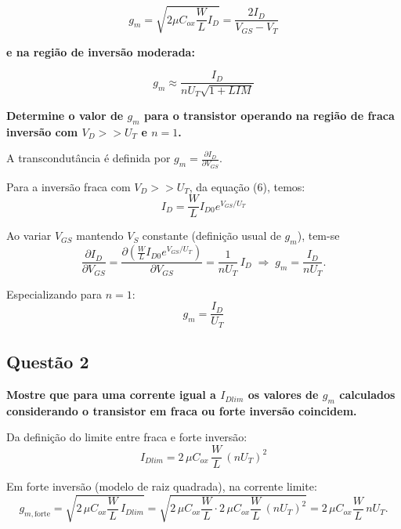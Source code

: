 ﻿\documentclass[12pt,a4paper]{article}
\begin{document}
\begin{equation}
g_m = \sqrt{2\mu C_{ox} \frac{W}{L} I_D} = \frac{2I_D}{V_{GS} - V_T}
\end{equation}

\textbf{e na região de inversão moderada:}

\begin{equation}
g_m \approx \frac{I_D}{nU_T \sqrt{1 +LIM}} 
\end{equation}

\textbf{Determine o valor de $g_m$ para o transistor operando na região de fraca inversão com $V_D >> U_T$ e $n = 1$.}

A transcondutância é definida por $g_m = \frac{\partial I_D}{\partial V_{GS}}$.

Para a inversão fraca com $V_D >> U_T$, da equação (6), temos:
\begin{equation*}
I_D = \frac{W}{L} I_{D0} e^{V_{GS}/U_T}
\end{equation*}

Ao variar $V_{GS}$ mantendo $V_S$ constante (definição usual de $g_m$), tem-se
\begin{equation*}
\frac{\partial I_D}{\partial V_{GS}} = \frac{\partial (\frac{W}{L} I_{D0} e^{V_{GS}/U_T})}{\partial V_{GS}} = \frac{1}{nU_T}\, I_D \;\Rightarrow\; g_m = \frac{I_D}{nU_T}.
\end{equation*}

Especializando para $n = 1$:
\begin{equation}
\boxed{g_m = \frac{I_D}{U_T}}
\end{equation}

\subsection*{Questão 2}
\textbf{Mostre que para uma corrente igual a $I_{Dlim}$ os valores de $g_m$ calculados considerando o transistor em fraca ou forte inversão coincidem.}

Da definição do limite entre fraca e forte inversão:
\begin{equation}
I_{Dlim} = 2\,\mu C_{ox}\,\frac{W}{L}\,(nU_T)^2
\end{equation}

Em forte inversão (modelo de raiz quadrada), na corrente limite:
\begin{equation*}
g_{m,\text{forte}}=\sqrt{2\,\mu C_{ox}\frac{W}{L}\,I_{Dlim}}
=\sqrt{2\,\mu C_{ox}\frac{W}{L}\cdot 2\,\mu C_{ox}\frac{W}{L}\,(nU_T)^2}
=2\,\mu C_{ox}\frac{W}{L}\,nU_T.
\end{equation*}
\end{document}
